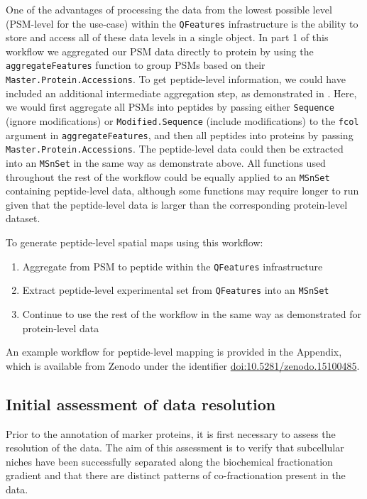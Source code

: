\documentclass[9pt,a4paper,]{extarticle}
\begin{document}
One of the advantages of processing the data from the lowest possible level
(PSM-level for the use-case) within the \texttt{QFeatures} infrastructure is the ability
to store and access all of these data levels in a single object. In part 1 of this
workflow we aggregated our PSM data directly to protein by using the
\texttt{aggregateFeatures} function to group PSMs based on their \texttt{Master.Protein.Accessions}.
To get peptide-level information, we could have included an additional intermediate
aggregation step, as demonstrated in \citet{Hutchings2023}. Here, we would first aggregate
all PSMs into peptides by passing either \texttt{Sequence} (ignore modifications) or
\texttt{Modified.Sequence} (include modifications) to the \texttt{fcol} argument in
\texttt{aggregateFeatures}, and then all peptides into proteins by passing
\texttt{Master.Protein.Accessions}. The peptide-level data could then be extracted into
an \texttt{MSnSet} in the same way as demonstrate above. All functions used throughout
the rest of the workflow could be equally applied to an \texttt{MSnSet} containing
peptide-level data, although some functions may require longer to run given that
the peptide-level data is larger than the corresponding protein-level dataset.

To generate peptide-level spatial maps using this workflow:

\begin{enumerate}
\def\labelenumi{\arabic{enumi}.}
\item
  Aggregate from PSM to peptide within the \texttt{QFeatures} infrastructure
\item
  Extract peptide-level experimental set from \texttt{QFeatures} into an \texttt{MSnSet}
\item
  Continue to use the rest of the workflow in the same way as demonstrated for protein-level data
\end{enumerate}

An example workflow for peptide-level mapping is provided in the Appendix, which
is available from Zenodo under the identifier \href{http://doi.org/10.5281/zenodo.15100485}{doi:10.5281/zenodo.15100485}.

\subsection{Initial assessment of data resolution}\label{initial-assessment-of-data-resolution}

Prior to the annotation of marker proteins, it is first necessary to assess the
resolution of the data. The aim of this assessment is to verify that subcellular
niches have been successfully separated along the biochemical fractionation
gradient and that there are distinct patterns of co-fractionation present in the
data.
\end{document}
